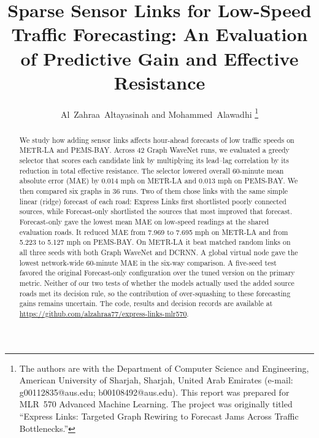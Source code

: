\documentclass[journal]{IEEEtran}
\begin{document}
\title{Sparse Sensor Links for Low-Speed Traffic Forecasting: An Evaluation of Predictive Gain and Effective Resistance}

\author{Al~Zahraa~Altayasinah and Mohammed~Alawadhi%
\thanks{The authors are with the Department of Computer Science and Engineering, American University of Sharjah, Sharjah, United Arab Emirates (e-mail: g00112835@aus.edu; b00108492@aus.edu). This report was prepared for MLR~570 Advanced Machine Learning. The project was originally titled ``Express Links: Targeted Graph Rewiring to Forecast Jams Across Traffic Bottlenecks.''}}


\maketitle


\begin{abstract}
We study how adding sensor links affects hour-ahead forecasts of low traffic speeds on METR-LA and PEMS-BAY. Across 42 Graph WaveNet runs, we evaluated a greedy selector that scores each candidate link by multiplying its lead--lag correlation by its reduction in total effective resistance. The selector lowered overall 60-minute mean absolute error (MAE) by 0.014 mph on METR-LA and 0.013 mph on PEMS-BAY. We then compared six graphs in 36 runs. Two of them chose links with the same simple linear (ridge) forecast of each road: Express Links first shortlisted poorly connected sources, while Forecast-only shortlisted the sources that most improved that forecast. Forecast-only gave the lowest mean MAE on low-speed readings at the shared evaluation roads. It reduced MAE from 7.969 to 7.695 mph on METR-LA and from 5.223 to 5.127 mph on PEMS-BAY. On METR-LA it beat matched random links on all three seeds with both Graph WaveNet and DCRNN. A global virtual node gave the lowest network-wide 60-minute MAE in the six-way comparison. A five-seed test favored the original Forecast-only configuration over the tuned version on the primary metric. Neither of our two tests of whether the models actually used the added source roads met its decision rule, so the contribution of over-squashing to these forecasting gains remains uncertain. The code, results and decision records are available at \url{https://github.com/alzahraa77/express-links-mlr570}.
\end{abstract}
\end{document}
